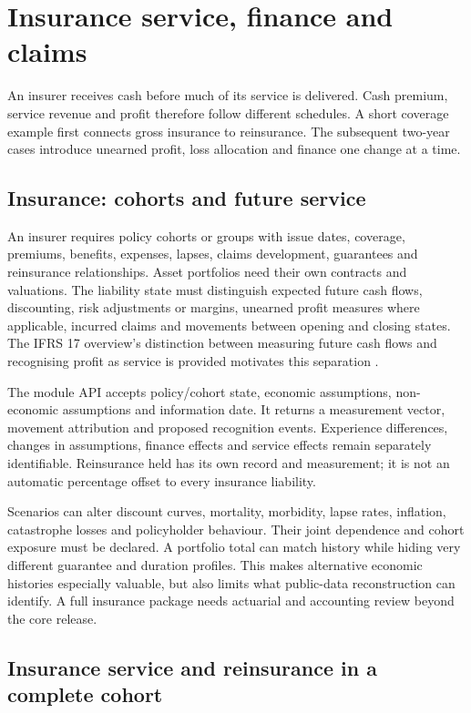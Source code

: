 \chapter{Insurance service, finance and claims}
\label{ch:insurance}

An insurer receives cash before much of its service is delivered. Cash premium,
service revenue and profit therefore follow different schedules. A short
coverage example first connects gross insurance to reinsurance. The subsequent
two-year cases introduce unearned profit, loss allocation and finance one
change at a time.

\section{Insurance: cohorts and future service}

An insurer requires policy cohorts or groups with issue dates, coverage,
premiums, benefits, expenses, lapses, claims development, guarantees and
reinsurance relationships. Asset portfolios need their own contracts and
valuations. The liability state must distinguish expected future cash flows,
discounting, risk adjustments or margins, unearned profit measures where
applicable, incurred claims and movements between opening and closing states.
The IFRS 17 overview's distinction between measuring future cash flows and
recognising profit as service is provided motivates this separation
\citep{ifrs17}.

The module API accepts policy/cohort state, economic assumptions, non-economic
assumptions and information date. It returns a measurement vector, movement
attribution and proposed recognition events. Experience differences, changes
in assumptions, finance effects and service effects remain separately
identifiable. Reinsurance held has its own record and measurement; it is not
an automatic percentage offset to every insurance liability.

Scenarios can alter discount curves, mortality, morbidity, lapse rates,
inflation, catastrophe losses and policyholder behaviour. Their joint
dependence and cohort exposure must be declared. A portfolio total can match
history while hiding very different guarantee and duration profiles. This
makes alternative economic histories especially valuable, but also limits
what public-data reconstruction can identify. A full insurance package needs
actuarial and accounting review beyond the core release.

\clearpage
\section{Insurance service and reinsurance in a complete cohort}

